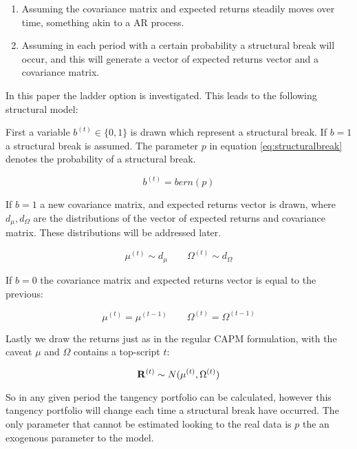 \begin{enumerate}
    \item Assuming the covariance matrix and expected returns steadily moves over time, something akin to a AR process.
    \item Assuming in each period with a certain probability a structural break will occur, and this will generate a vector of expected returns vector and a covariance matrix.
\end{enumerate}

In this paper the ladder option is investigated. This leads to the following structural model:

First a variable $b^{(t)}\in \{0,1\}$ is drawn which represent a structural break. If $b=1$ a structural break is assumed. The parameter $p$ in equation \ref{eq:structuralbreak} denotes the probability of a structural break.

\begin{equation}\label{eq:structuralbreak}
    b^{(t)} = bern(p)
\end{equation}

If $b = 1$ a new covariance matrix, and expected returns vector is drawn, where $d_{\mu}, d_{\Omega}$ are the distributions of the vector of expected returns  and covariance matrix. These distributions will be addressed later.

\begin{equation}
    \mu^{(t)} \sim d_{\mu} \qquad \Omega^{(t)} \sim d_{\Omega}
\end{equation}

If $b=0$ the covariance matrix and expected returns vector is equal to the previous:

\begin{equation}
    \mu^{(t)} = \mu^{(t-1)} \qquad \Omega^{(t)} = \Omega^{(t-1)}
\end{equation}

Lastly we draw the returns just as in the regular CAPM formulation, with the caveat $\mu$ and $\Omega$ contains a top-script $t$:

\begin{equation}
    \mathbf{R}^{(t)} \sim N(\mu^{(t)}, \Omega^{(t)})
\end{equation}

So in any given period the tangency portfolio can be calculated, however this tangency portfolio will change each time a structural break have occurred. The only parameter that cannot be estimated looking to the real data is $p$ the an exogenous parameter to the model.

